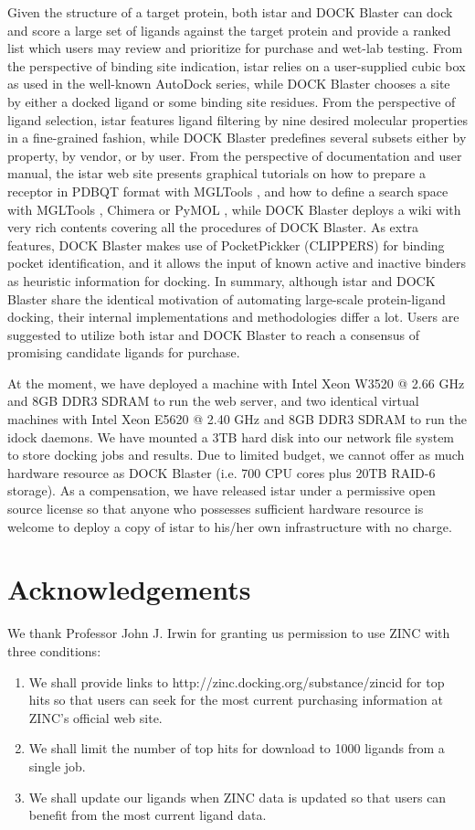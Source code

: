 \documentclass[10pt]{article}
\begin{document}
Given the structure of a target protein, both istar and DOCK Blaster can dock and score a large set of ligands against the target protein and provide a ranked list which users may review and prioritize for purchase and wet-lab testing. From the perspective of binding site indication, istar relies on a user-supplied cubic box as used in the well-known AutoDock series, while DOCK Blaster chooses a site by either a docked ligand or some binding site residues. From the perspective of ligand selection, istar features ligand filtering by nine desired molecular properties in a fine-grained fashion, while DOCK Blaster predefines several subsets either by property, by vendor, or by user. From the perspective of documentation and user manual, the istar web site presents graphical tutorials on how to prepare a receptor in PDBQT format with MGLTools \cite{596}, and how to define a search space with MGLTools \cite{596}, Chimera \cite{1219} or PyMOL \cite{1221}, while DOCK Blaster deploys a wiki with very rich contents covering all the procedures of DOCK Blaster. As extra features, DOCK Blaster makes use of PocketPickker (CLIPPERS) \cite{395} for binding pocket identification, and it allows the input of known active and inactive binders as heuristic information for docking. In summary, although istar and DOCK Blaster share the identical motivation of automating large-scale protein-ligand docking, their internal implementations and methodologies differ a lot. Users are suggested to utilize both istar and DOCK Blaster to reach a consensus of promising candidate ligands for purchase.

At the moment, we have deployed a machine with Intel Xeon W3520 @ 2.66 GHz and 8GB DDR3 SDRAM to run the web server, and two identical virtual machines with Intel Xeon E5620 @ 2.40 GHz and 8GB DDR3 SDRAM to run the idock daemons. We have mounted a 3TB hard disk into our network file system to store docking jobs and results. Due to limited budget, we cannot offer as much hardware resource as DOCK Blaster (i.e. 700 CPU cores plus 20TB RAID-6 storage). As a compensation, we have released istar under a permissive open source license so that anyone who possesses sufficient hardware resource is welcome to deploy a copy of istar to his/her own infrastructure with no charge.

\section*{Acknowledgements}
We thank Professor John J. Irwin for granting us permission to use ZINC \cite{532,1178} with three conditions:
\begin{enumerate}
\item We shall provide links to http://zinc.docking.org/substance/zincid for top hits so that users can seek for the most current purchasing information at ZINC's official web site.
\item We shall limit the number of top hits for download to 1000 ligands from a single job.
\item We shall update our ligands when ZINC data is updated so that users can benefit from the most current ligand data.
\end{enumerate}
\end{document}
